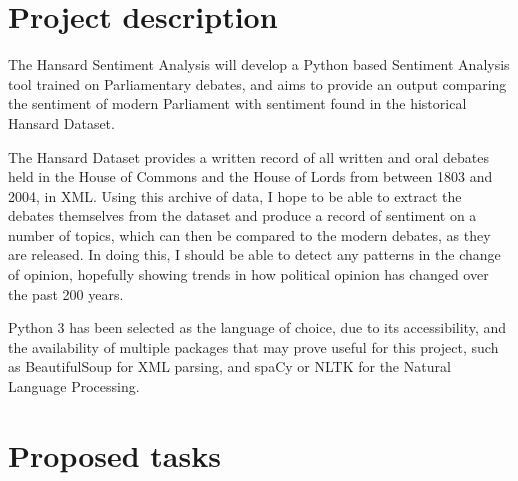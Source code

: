 \documentclass[11pt,fleqn,twoside]{article}
\begin{document}
\wordcount{}

\mmp

\setcounter{tocdepth}{3} %


\section{Project description}
The Hansard  Sentiment Analysis will develop a Python based Sentiment Analysis tool trained on Parliamentary debates, and aims to provide an output comparing the sentiment of modern Parliament with sentiment found in the historical Hansard Dataset. 
\par
The Hansard Dataset provides a written record of all written and oral debates held in the House of Commons and the House of Lords from between 1803 and 2004, in XML. Using this archive of data, I hope to be able to extract the debates themselves from the dataset and produce a record of sentiment on a number of topics, which can then be compared to the modern debates, as they are released. In doing this, I should be able to detect any patterns in the change of opinion, hopefully showing trends in how political opinion has changed over the past 200 years. 
\par
Python 3 has been selected as the language of choice, due to its accessibility, and the availability of multiple packages that may prove useful for this project, such as BeautifulSoup for XML parsing, and spaCy or NLTK for the Natural Language Processing.


\section{Proposed tasks}
\end{document}
